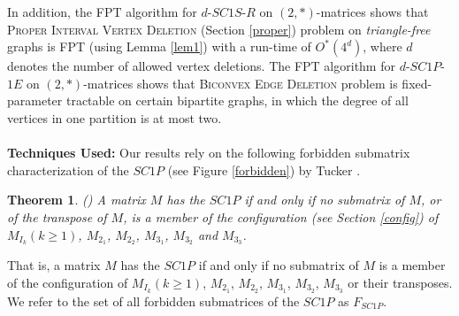 \documentclass[review, 1p]{elsarticle}
\newtheorem{theorem}{Theorem}
\begin{document}
In addition, the FPT algorithm for $d$-$SC1S$-$R$ on $(2,*)$-matrices shows that \textsc{Proper Interval Vertex Deletion} (Section \ref{proper}) problem on \textit{triangle-free} graphs is FPT (using Lemma \ref{lem1}) with a run-time of $O^{*}(4^{d})$, where $d$ denotes the number of allowed vertex deletions. The FPT algorithm for $d$-$SC1P$-$1E$ on $(2,*)$-matrices shows that \textsc{Biconvex Edge Deletion} problem is fixed-parameter tractable on certain  bipartite graphs, in which the degree of all vertices in one partition is at most two.\\\\
\textbf{Techniques Used:} Our results rely on the following forbidden submatrix characterization of the $SC1P$ (see Figure \ref{forbidden}) by Tucker \cite{tucker1972structure}.\begin{theorem}\label{thm2} \textup{(\cite [Theorem 11] {tucker1972structure})} A matrix $M$ has the $SC1P$ if and only if no submatrix of $M$, or of the transpose of $M$, is a member of the configuration (see Section \ref{config})  
 of $M_{I_{k}}(k \geq 1)$, $M_{2_{1}}$, $M_{2_{2}}$, $M_{3_{1}}$, $M_{3_{2}}$  and $M_{3_{3}}$.\end{theorem} \noindent That is, a matrix $M$ has the $SC1P$ if and only if no submatrix of $M$ is a member of the configuration of $M_{I_{k}} (k \geq 1)$, $M_{2_{1}}$,  $M_{2_{2}}$, $M_{3_{1}}$, $M_{3_{2}}$,  $M_{3_{3}}$ or their transposes. We refer to the set of all forbidden submatrices of the $SC1P$ as $F_{SC1P}$.
 
\end{document}
